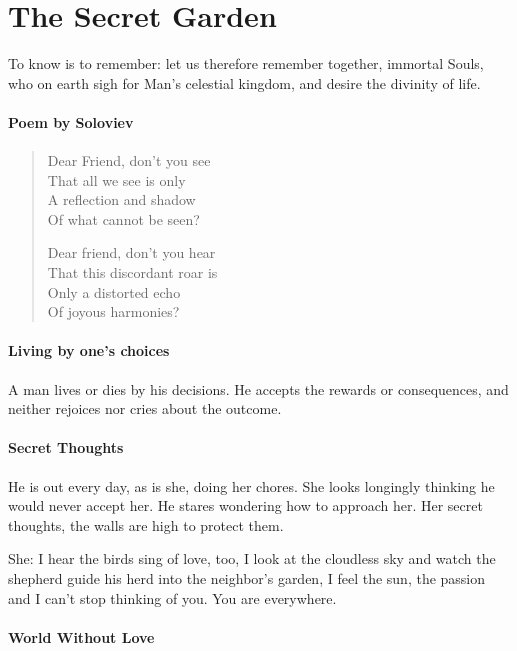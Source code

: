 \section{The Secret Garden}

\begin{quotex}
To know is to remember: let us therefore remember together, immortal Souls, who on earth sigh for Man's celestial kingdom, and desire the divinity of life. 
\end{quotex}

\paragraph{Poem by Soloviev}

\begin{verse}
Dear Friend, don't you see\\
That all we see is only\\
A reflection and shadow\\
Of what cannot be seen?

Dear friend, don't you hear\\
That this discordant roar is\\
Only a distorted echo\\
Of joyous harmonies?
\end{verse}

\paragraph{Living by one's choices}


A man lives or dies by his decisions. He accepts the rewards or consequences, and neither rejoices nor cries about the outcome.

\paragraph{Secret Thoughts}


He is out every day, as is she, doing her chores. She looks longingly thinking he would never accept her. He stares wondering how to approach her. Her secret thoughts, the walls are high to protect them.

She: I hear the birds sing of love, too, I look at the cloudless sky and watch the shepherd guide his herd into the neighbor's garden, I feel the sun, the passion and I can't stop thinking of you. You are everywhere.

\paragraph{World Without Love}


